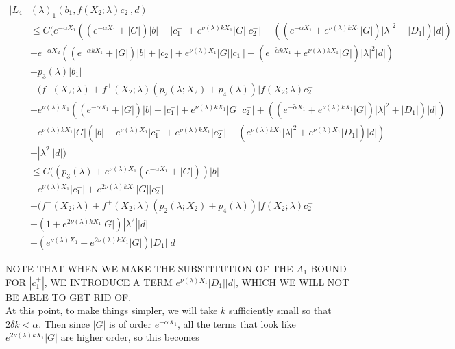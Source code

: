 \documentclass[12pt]{article}
\begin{document}
\begin{enumerate}
\begin{align*}
|L_4&(\lambda)_1(b_1, f(X_2; \lambda) c_2^-, d)|\\ 
&\leq C( e^{-\alpha X_1}((e^{-\alpha X_1} + |G|) |b| + |c_1^-| + e^{\nu(\lambda)k X_1} |G||c_2^-| + ((e^{-\tilde{\alpha} X_1} + e^{\nu(\lambda)k X_1} |G|) |\lambda|^2 + |D_1| )|d| ) \\
&+ e^{-\alpha X_2} ((e^{-\alpha k X_1} + |G|) |b| + |c_2^-| + e^{\nu(\lambda) X_1} |G||c_1^-| + (e^{-\tilde{\alpha} k X_1} + e^{\nu(\lambda)k X_1} |G|) |\lambda|^2 |d| ) \\
&+ p_3(\lambda) |b_1| \\
&+ (f^-(X_2; \lambda) + f^+(X_2; \lambda) (p_2(\lambda; X_2) + p_4(\lambda)) | f(X_2; \lambda) c_2^-| \\
&+ e^{\nu(\lambda)X_1} ((e^{-\alpha X_1} + |G|) |b| + |c_1^-| + e^{\nu(\lambda)k X_1} |G||c_2^-| + ((e^{-\tilde{\alpha} X_1} + e^{\nu(\lambda)k X_1} |G|) |\lambda|^2 + |D_1| )|d| ) \\
&+ e^{\nu(\lambda)k X_1}|G| ( |b| + e^{\nu(\lambda) X_1} |c_1^-| +  e^{\nu(\lambda) k X_1} |c_2^-| + (e^{\nu(\lambda)k X_1}|\lambda|^2 + e^{\nu(\lambda) X_1} |D_1|) |d| )\\
&+ |\lambda^2||d|) \\
&\leq C( ( p_3(\lambda) + e^{\nu(\lambda)X_1} (e^{-\alpha X_1} + |G|)) |b| \\
&+ e^{\nu(\lambda)X_1} |c_1^-| + e^{2 \nu(\lambda)k X_1}|G| |c_2^-| \\
&+ (f^-(X_2; \lambda) + f^+(X_2; \lambda) (p_2(\lambda; X_2) + p_4(\lambda)) | f(X_2; \lambda) c_2^-| \\
&+ (1 + e^{2 \nu(\lambda)k X_1}|G|)|\lambda^2||d| \\
&+ (e^{\nu(\lambda)X_1} + e^{2 \nu(\lambda)k X_1}|G| )|D_1||d
\end{align*}

NOTE THAT WHEN WE MAKE THE SUBSTITUTION OF THE $A_1$ BOUND FOR $|c_1^+|$, WE INTRODUCE A TERM $e^{\nu(\lambda)X_1} |D_1| |d|$, WHICH WE WILL NOT BE ABLE TO GET RID OF.\\

At this point, to make things simpler, we will take $k$ sufficiently small so that $2 \delta k < \alpha$. Then since $|G|$ is of order $e^{-\alpha X_1}$, all the terms that look like $e^{2 \nu(\lambda)k X_1}|G|$ are higher order, so this becomes


\end{enumerate}
\end{document}
